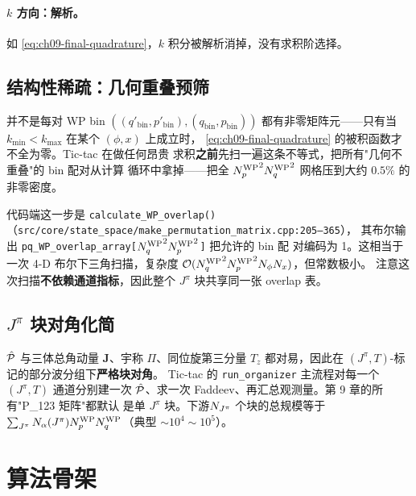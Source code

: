 \paragraph{\(k\) 方向：解析。}
如 \eqref{eq:ch09-final-quadrature}，\(k\) 积分被解析消掉，没有求积阶选择。

\subsection{结构性稀疏：几何重叠预筛}
\label{subsec:ch09-WP-overlap-mask}

并不是每对 WP bin \(((q'_{\text{bin}}, p'_{\text{bin}}), (q_{\text{bin}}, p_{\text{bin}}))\)
都有非零矩阵元——只有当 \(k_{\min}<k_{\max}\) 在某个 \((\phi,x)\) 上成立时，
\eqref{eq:ch09-final-quadrature} 的被积函数才不全为零。Tic-tac 在做任何昂贵
求积\textbf{之前}先扫一遍这条不等式，把所有"几何不重叠"的 bin 配对从计算
循环中拿掉——把全 \({N_{p}^{\text{WP}}}^2{N_{q}^{\text{WP}}}^2\) 网格压到大约 \(0.5\%\) 的非零密度。

代码端这一步是 \texttt{calculate\_WP\_overlap()}
（\texttt{src/core/state\_space/make\_permutation\_matrix.cpp:205--365}），
其布尔输出 \texttt{pq\_WP\_overlap\_array[${N_{q}^{\text{WP}}}^2{N_{p}^{\text{WP}}}^2$]} 把允许的 bin 配
对编码为 1。这相当于一次 4-D
布尔下三角扫描，复杂度 \(\mathcal{O}({N_{q}^{\text{WP}}}^2{N_{p}^{\text{WP}}}^2N_{\phi}N_{x})\)，但常数极小。
注意这次扫描\textbf{不依赖通道指标}，因此整个 \(J^\pi\) 块共享同一张
overlap 表。

\subsection{\texorpdfstring{$J^\pi$}{Jpi} 块对角化简}
\label{subsec:ch09-Jpi-block}

\(\hat{\mathcal{P}}\) 与三体总角动量 \(\boldsymbol{J}\)、宇称 \(\Pi\)、同位旋第三分量
\(T_z\) 都对易，因此在 \((J^\pi,T)\)-标记的部分波分组下\textbf{严格块对角}。
Tic-tac 的 \texttt{run\_organizer} 主流程对每一个 \((J^\pi,T)\) 通道分别建一次
\(\hat{\mathcal{P}}\)、求一次 Faddeev、再汇总观测量。第 9 章的所有"P\_123 矩阵"都默认
是单 \(J^\pi\) 块。下游\(N_{J^\pi}\) 个块的总规模等于
\(\sum_{J^\pi}N_\alpha(J^\pi){N_{p}^{\text{WP}}}{N_{q}^{\text{WP}}}\)（典型 \(\sim 10^4\sim 10^5\)）。

\section{算法骨架}
\label{sec:ch09-algorithm}

